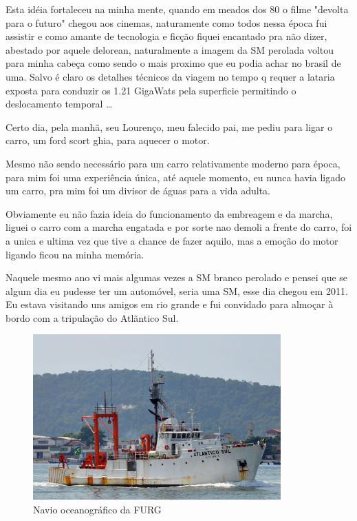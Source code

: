 \documentclass[a4paper]{report}
\begin{document}
Esta id\'eia fortaleceu na minha mente, quando em meados dos 80 o filme "devolta para o futuro" chegou aos cinemas, naturamente como todos nessa \'epoca
fui assistir e como amante de tecnologia e fic\c{c}\~ao fiquei encantado pra n\~ao dizer, abestado por aquele delorean, naturalmente a imagem da SM perolada
voltou para minha cabe\c{c}a como sendo o mais proximo que eu podia achar no brasil de uma. Salvo \'e claro os detalhes t\'ecnicos da viagem no tempo q requer
a lataria exposta para conduzir os 1.21 GigaWats pela superficie permitindo o deslocamento temporal \dots

Certo dia, pela manh\~a, seu Louren\c{c}o, meu falecido pai, me pediu para ligar o carro, um ford scort ghia, para aquecer o motor.

Mesmo n\~ao sendo necess\'ario para um carro relativamente moderno para \'epoca, para mim foi uma experi\^encia \'unica,
at\'e aquele momento, eu nunca havia ligado um carro, pra mim foi um divisor de \'aguas para a vida adulta.

Obviamente eu n\~ao fazia ideia do funcionamento da embreagem e da marcha, liguei o carro com a marcha engatada e por sorte
nao demoli a frente do carro, foi a unica e ultima vez que tive a chance de fazer aquilo, mas a emo\c{c}\~ao do motor ligando ficou
na minha mem\'oria. 

Naquele mesmo ano vi mais algumas vezes a SM branco perolado e pensei que se algum dia eu pudesse ter um
autom\'ovel, seria uma SM, esse dia chegou em 2011.
\clearpage
Eu estava visitando uns amigos em rio grande e fui convidado para almo\c{c}ar \`a bordo com a tripula\c{c}\~ao do Atl\~antico Sul.

\begin{figure}[!htb]
\centering
\includegraphics{atsul}
\caption{Navio oceanogr\'afico da FURG}
\label{at_sul}
\end{figure}
\end{document}
